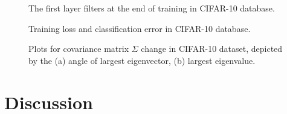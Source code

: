 \documentclass{bmvc2k}
\begin{document}
\begin{figure}
	\centering
	\caption{The first layer filters at the end of training in CIFAR-10 database.}
	\label{fig:cifar10:filter1}
\end{figure}

\begin{figure}
	\centering     %
	
	
	\caption{Training loss and classification error in CIFAR-10 database.}
	\label{fig:cifar10:results}
\end{figure}

\begin{figure}
	\centering
	\caption{Plots for covariance matrix $\Sigma$ change in CIFAR-10 dataset, depicted by the (a) angle of largest eigenvector, (b) largest eigenvalue.}
	\label{fig:cifar:convchange}
\end{figure}

\section{Discussion}
\end{document}

